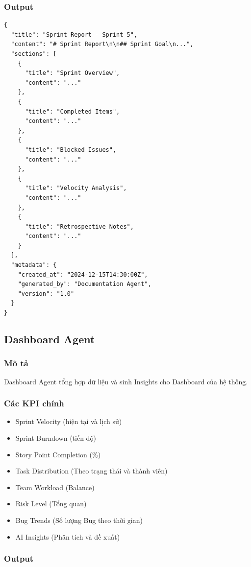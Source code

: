 \documentclass[12pt,a4paper]{report}
\begin{document}
\subsubsection{Output}

\begin{verbatim}
{
  "title": "Sprint Report - Sprint 5",
  "content": "# Sprint Report\n\n## Sprint Goal\n...",
  "sections": [
    {
      "title": "Sprint Overview",
      "content": "..."
    },
    {
      "title": "Completed Items",
      "content": "..."
    },
    {
      "title": "Blocked Issues",
      "content": "..."
    },
    {
      "title": "Velocity Analysis",
      "content": "..."
    },
    {
      "title": "Retrospective Notes",
      "content": "..."
    }
  ],
  "metadata": {
    "created_at": "2024-12-15T14:30:00Z",
    "generated_by": "Documentation Agent",
    "version": "1.0"
  }
}
\end{verbatim}

\subsection{Dashboard Agent}

\subsubsection{Mô tả}

Dashboard Agent tổng hợp dữ liệu và sinh Insights cho Dashboard của hệ thống.

\subsubsection{Các KPI chính}

\begin{itemize}
\item Sprint Velocity (hiện tại và lịch sử)
\item Sprint Burndown (tiến độ)
\item Story Point Completion (\%)
\item Task Distribution (Theo trạng thái và thành viên)
\item Team Workload (Balance)
\item Risk Level (Tổng quan)
\item Bug Trends (Số lượng Bug theo thời gian)
\item AI Insights (Phân tích và đề xuất)
\end{itemize}

\subsubsection{Output}
\end{document}
